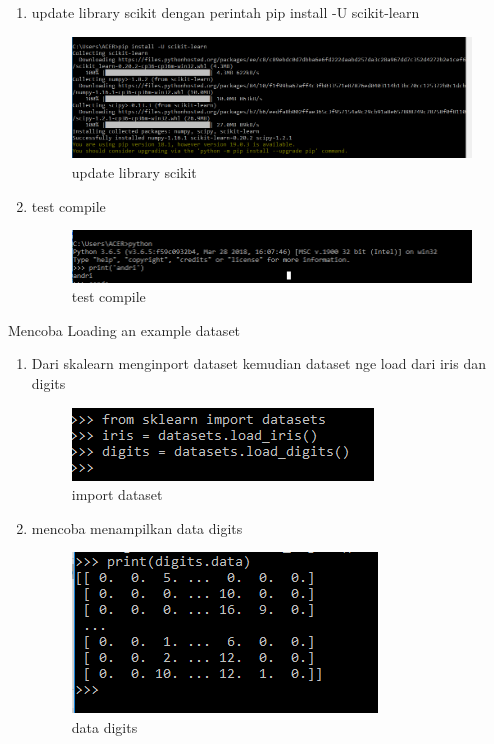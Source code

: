 \begin {enumerate}
\item update library scikit dengan perintah pip install -U scikit-learn
\par
\begin{figure}[ht]
\centering
\includegraphics[scale=0.5]{figures/333.png}
\caption{update library scikit}
\label{contoh3}
\end{figure}
\par

\item test compile
\par
\begin{figure}[ht]
\centering
\includegraphics[scale=0.5]{figures/444.png}
\caption{test compile}
\label{contoh4}
\end{figure}
\end {enumerate}
\par

Mencoba Loading an example dataset
\begin {enumerate}
\par
\item Dari skalearn menginport dataset kemudian dataset nge load dari iris dan digits
\par
\begin{figure}[ht]
\centering
\includegraphics[scale=0.5]{figures/555.png}
\caption{import dataset}
\label{contoh5}
\end{figure}
\par
\item mencoba menampilkan data digits
\par
\begin{figure}[ht]
\centering
\includegraphics[scale=0.5]{figures/666.png}
\caption{data digits}
\label{contoh6}
\end{figure}
\end {enumerate}

